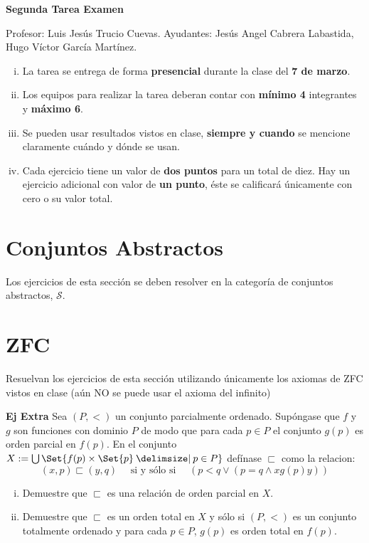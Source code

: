 \documentclass[11pt]{article}
\providecommand\st{\;|\;}
\newcommand\SetSymbol[1][]{%
    \nonscript\:#1\vert
    \allowbreak
    \nonscript\:
    \mathopen{}}
\renewcommand\st{\SetSymbol[\delimsize]}
\renewcommand\st{\SetSymbol[\delimsize]}
\newcommand{\topos}[1]{\mathscr{#1}}
\begin{document}
    \begin{center}
      \Huge \textbf{Segunda Tarea Examen} \\
    \end{center}
    \begin{flushright}
      \footnotesize Profesor: Luis Jesús Trucio Cuevas. \hfill Ayudantes: Jesús Angel Cabrera Labastida,\\
      \hfill Hugo Víctor García Martínez.
    \end{flushright}
    \footnotesize
    \begin{enumerate}[i)]
      \item La tarea se entrega de forma \textbf{presencial} durante la clase del \textbf{7 de marzo}.
      \item Los equipos para realizar la tarea deberan contar con \textbf{mínimo 4} integrantes y \textbf{máximo 6}.
      \item Se pueden usar resultados vistos en clase, \textbf{siempre y cuando} se mencione claramente cuándo y dónde se usan.
      \item Cada ejercicio tiene un valor de \textbf{dos puntos} para un total de diez. Hay un ejercicio adicional con valor de \textbf{un punto}, éste se calificará únicamente con cero o su valor total.
  \end{enumerate}\normalsize

    \section*{Conjuntos Abstractos}
    Los ejercicios de esta sección se deben resolver en la categoría de
    conjuntos abstractos, \(\topos{S}\).
    
    
    \section*{ZFC}
    Resuelvan los ejercicios de esta sección utilizando únicamente los axiomas de ZFC vistos en clase (aún NO se puede usar el axioma del infinito)
    
     \vspace{.5cm}

    \noindent \textbf{Ej Extra} Sea $(P,<)$ un conjunto parcialmente ordenado. Supóngase que $f$ y $g$ son funciones con dominio $P$ de modo que para cada $p \in P$ el conjunto $g(p)$ es orden parcial en $f(p)$. En el conjunto $X:=\bigcup\Set{ f(p) \times \Set{p} \st p \in P  }$ defínase $\sqsubset$ como la relacion:
    \[ (x,p) \sqsubset (y,q) \quad \text{ si y sólo si } \quad \left( p < q \lor \left( p=q \land x \mathrel{g(p)} y  \right) \right) \]
    \begin{enumerate}[i)]
      \item Demuestre que $\sqsubset$ es una relación de orden parcial en $X$.
      \item Demuestre que $\sqsubset$ es un orden total en $X$ y sólo si $(P,<)$ es un conjunto totalmente ordenado y para cada $p \in P$, $g(p)$ es orden total en $f(p)$.
    \end{enumerate}

\end{document}

